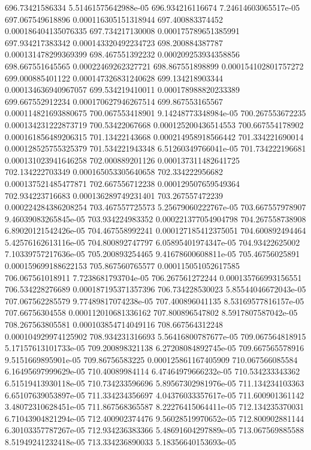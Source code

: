 {696.73421586334 5.51461575642988e-05
696.934216116674 7.24614603065517e-05
697.067549618896 0.000116305151318944
697.400883374452 0.000186404135076335
697.734217130008 0.000175789651385991
697.934217383342 0.000143320492234723
698.200884387787 0.000131478299369399
698.467551392232 0.000209253934358856
698.667551645565 0.00022469262327721
698.867551898899 0.000154102801757272
699.000885401122 0.000147326831240628
699.134218903344 0.000134636940967057
699.534219410011 0.000178988820233389
699.667552912234 0.000170627946267514
699.867553165567 0.000114821693880675
700.067553418901 9.14248773348984e-05
700.267553672235 0.000134231222873719
700.53422067668 0.000125200436514553
700.667554178902 0.000161856489206315
701.13422143668 0.000214958918566442
701.334221690014 0.000128525755325379
701.534221943348 6.51260349766041e-05
701.734222196681 0.000131023941646258
702.000889201126 0.000137311482641725
702.134222703349 0.000165053305640658
702.334222956682 0.000137521485477871
702.667556712238 0.000129507659549364
702.934223716683 0.000136289749231401
703.267557472239 0.000224284386208254
703.467557725573 5.25679060222767e-05
703.667557978907 9.46039083265845e-05
703.934224983352 0.000221377054904798
704.267558738908 6.89020121542426e-05
704.467558992241 0.000127185412375051
704.600892494464 5.42576162613116e-05
704.800892747797 6.05895401974347e-05
704.93422625002 7.10339757217636e-05
705.200893254465 9.41678600608811e-05
705.46756025891 0.000159699188622153
705.867560765577 0.000115051052617585
706.067561018911 7.7238681793704e-05
706.267561272244 0.000135766993156551
706.534228276689 0.000187195371357396
706.734228530023 5.85544046672043e-05
707.067562285579 9.77489817074238e-05
707.400896041135 8.53169577816157e-05
707.66756304558 0.000112010681336162
707.800896547802 8.5917807587042e-05
708.267563805581 0.000103854714049116
708.667564312248 0.000104929974125902
708.934231316693 5.56416800787677e-05
709.067564818915 5.17157613101733e-05
709.200898321138 6.27208084892745e-05
709.667565578916 9.5151669895901e-05
709.86756583225 0.000125861167405909
710.067566085584 6.16495697999629e-05
710.40089984114 6.47464979666232e-05
710.534233343362 6.51519413930118e-05
710.734233596696 5.89567302981976e-05
711.134234103363 6.65107639053897e-05
711.334234356697 4.04376033357617e-05
711.600901361142 3.48072310628451e-05
711.867568365587 8.22276415064411e-05
712.134235370031 6.71043904821294e-05
712.400902374476 9.56028519970652e-05
712.800902881144 6.30103357787267e-05
712.934236383366 5.48691604297889e-05
713.067569885588 8.51949241232418e-05
713.334236890033 5.18356640153693e-05
}
